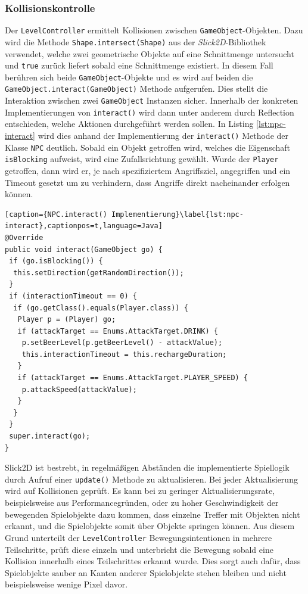 \subsubsection{Kollisionskontrolle}
Der \texttt{LevelController} ermittelt Kollisionen zwischen \texttt{GameObject}-Objekten.
Dazu wird die Methode \texttt{Shape.intersect(Shape)} aus der \textit{Slick2D}-Bibliothek verwendet, welche zwei geometrische Objekte auf eine Schnittmenge untersucht und \texttt{true} zurück liefert sobald eine Schnittmenge existiert.
In diesem Fall berühren sich beide \texttt{GameObject}-Objekte und es wird auf beiden die \texttt{GameObject.interact(GameObject)} Methode aufgerufen.
Dies stellt die Interaktion zwischen zwei \texttt{GameObject} Instanzen sicher.
Innerhalb der konkreten Implementierungen von \texttt{interact()} wird dann unter anderem durch Reflection entschieden, welche Aktionen durchgeführt werden sollen.
In Listing \ref{lst:npc-interact} wird dies anhand der Implementierung der \texttt{interact()} Methode der Klasse \texttt{NPC} deutlich.
Sobald ein Objekt getroffen wird, welches die Eigenschaft \texttt{isBlocking} aufweist, wird eine Zufallsrichtung gewählt.
Wurde der \texttt{Player} getroffen, dann wird er, je nach spezifiziertem Angriffsziel, angegriffen und ein Timeout gesetzt um zu verhindern, dass Angriffe direkt nacheinander erfolgen können.

\begin{lstlisting}[caption={NPC.interact() Implementierung}\label{lst:npc-interact},captionpos=t,language=Java]
@Override
public void interact(GameObject go) {
 if (go.isBlocking()) {
  this.setDirection(getRandomDirection());
 }
 if (interactionTimeout == 0) {
  if (go.getClass().equals(Player.class)) {
   Player p = (Player) go;
   if (attackTarget == Enums.AttackTarget.DRINK) {
    p.setBeerLevel(p.getBeerLevel() - attackValue);
    this.interactionTimeout = this.rechargeDuration;
   }
   if (attackTarget == Enums.AttackTarget.PLAYER_SPEED) {
    p.attackSpeed(attackValue);
   }
  }
 }
 super.interact(go);
}

\end{lstlisting}

Slick2D ist bestrebt, in regelmäßigen Abständen die implementierte Spiellogik durch Aufruf einer \texttt{update()} Methode zu aktualisieren.
Bei jeder Aktualisierung wird auf Kollisionen geprüft.
Es kann bei zu geringer Aktualisierungsrate, beispielsweise aus Performancegründen, oder zu hoher Geschwindigkeit der bewegenden Spielobjekte dazu kommen, dass einzelne Treffer mit Objekten nicht erkannt, und die Spielobjekte somit über Objekte springen können.
Aus diesem Grund unterteilt der \texttt{LevelController} Bewegungsintentionen in mehrere Teilschritte, prüft diese einzeln und unterbricht die Bewegung sobald eine Kollision innerhalb eines Teilschrittes erkannt wurde.
Dies sorgt auch dafür, dass Spielobjekte sauber an Kanten anderer Spielobjekte stehen bleiben und nicht beispielsweise wenige Pixel davor.



